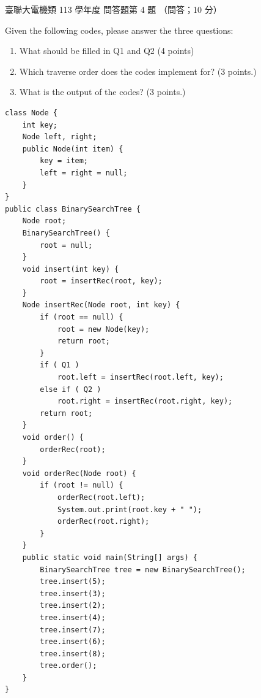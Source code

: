 \begin{pastexam}[label={px:ust-113-ee-ds-20}]{臺聯大電機類 113 學年度 問答題第 4 題}
（問答；10 分）

Given the following codes, please answer the three questions:
\begin{enumerate}[label=(\Alph*)]
\item What should be filled in Q1 and Q2 (4 points)
\item Which traverse order does the codes implement for? (3 points.)
\item What is the output of the codes? (3 points.)
\end{enumerate}
\begin{verbatim}
class Node {
    int key;
    Node left, right;
    public Node(int item) {
        key = item;
        left = right = null;
    }
}
public class BinarySearchTree {
    Node root;
    BinarySearchTree() {
        root = null;
    }
    void insert(int key) {
        root = insertRec(root, key);
    }
    Node insertRec(Node root, int key) {
        if (root == null) {
            root = new Node(key);
            return root;
        }
        if ( Q1 )
            root.left = insertRec(root.left, key);
        else if ( Q2 )
            root.right = insertRec(root.right, key);
        return root;
    }
    void order() {
        orderRec(root);
    }
    void orderRec(Node root) {
        if (root != null) {
            orderRec(root.left);
            System.out.print(root.key + " ");
            orderRec(root.right);
        }
    }
    public static void main(String[] args) {
        BinarySearchTree tree = new BinarySearchTree();
        tree.insert(5);
        tree.insert(3);
        tree.insert(2);
        tree.insert(4);
        tree.insert(7);
        tree.insert(6);
        tree.insert(8);
        tree.order();
    }
}
\end{verbatim}
\end{pastexam}


